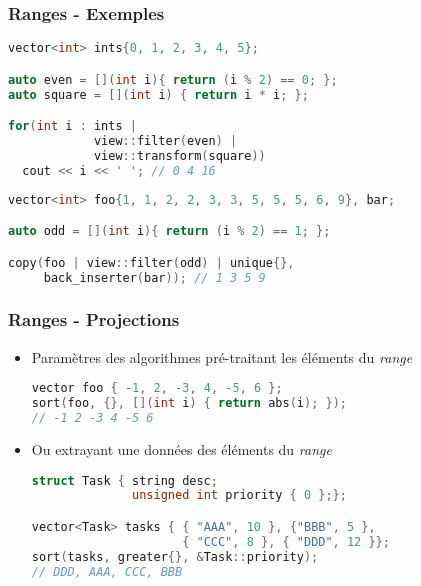 \documentclass[C++.tex]{subfiles}
\begin{document}
\begin{frame}[fragile]
	\frametitle{Ranges - Exemples}
	\begin{lstlisting}[language=C++]
vector<int> ints{0, 1, 2, 3, 4, 5};

auto even = [](int i){ return (i % 2) == 0; };
auto square = [](int i) { return i * i; };

for(int i : ints | 
            view::filter(even) | 
            view::transform(square))
  cout << i << ' '; // 0 4 16\end{lstlisting}

	\begin{lstlisting}[language=C++]
vector<int> foo{1, 1, 2, 2, 3, 3, 5, 5, 5, 6, 9}, bar;

auto odd = [](int i){ return (i % 2) == 1; };

copy(foo | view::filter(odd) | unique{}, 
     back_inserter(bar)); // 1 3 5 9\end{lstlisting}
\end{frame}

\begin{frame}[fragile]
	\frametitle{Ranges - Projections}
	\begin{itemize}
		\item Paramètres des algorithmes pré-traitant les éléments du \textit{range}

		\begin{lstlisting}[language=C++]
vector foo { -1, 2, -3, 4, -5, 6 };
sort(foo, {}, [](int i) { return abs(i); }); 
// -1 2 -3 4 -5 6\end{lstlisting}


		\item Ou extrayant une données des éléments du \textit{range}

		\begin{lstlisting}[language=C++]
struct Task { string desc;
              unsigned int priority { 0 };};

vector<Task> tasks { { "AAA", 10 }, {"BBB", 5 }, 
                     { "CCC", 8 }, { "DDD", 12 }};
sort(tasks, greater{}, &Task::priority);
// DDD, AAA, CCC, BBB\end{lstlisting}
	\end{itemize}
\end{frame}
\end{document}
